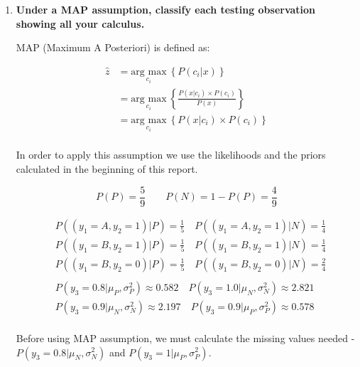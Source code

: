 \documentclass[12pt]{article}
\begin{document}
\begin{enumerate}[leftmargin=\labelsep]
    \item \textbf{Under a MAP assumption, classify each testing observation showing all your
    calculus.}

    \vspace{10pt}
    MAP (Maximum A Posteriori) is defined as:
    
    \begin{equation}\label{map}
        \begin{aligned}
          \hat{z} & = \underset{c_i}{\text{arg max}} \medspace \left\{P(c_i | x)\right\} \\
                  & = \underset{c_i}{\text{arg max}} \medspace \left\{\frac{P(x | c_i)  \times P(c_i)}{P(x)}\right\} \\
                  & = \underset{c_i}{\text{arg max}} \medspace \left\{P(x | c_i)  \times P(c_i)\right\} \\
        \end{aligned}
    \end{equation}

    \vspace{10pt}
    In order to apply this assumption we use the likelihoods and the priors calculated in the beginning of this report.

    \begin{equation*}
        P(P) = \frac{5}{9} \quad \quad P(N) = 1- P(P) = \frac{4}{9} 
    \end{equation*}

    \begin{equation*}
        \begin{aligned}
        &P((y_1 = A, y_2 = 1)|P) = \frac{1}{5} \quad P((y_1 = A, y_2 = 1)|N) = \frac{1}{4}\\
        &P((y_1 = B, y_2 = 1)|P) = \frac{1}{5} \quad P((y_1 = B, y_2 = 1)|N) = \frac{1}{4}\\
        &P((y_1 = B, y_2 = 0)|P) = \frac{1}{5} \quad P((y_1 = B, y_2 = 0)|N) = \frac{2}{4}\\
        \\
        &P(y_3 = 0.8|\mu_P, \sigma_P^2) \approx 0.582 \quad P(y_3 = 1.0|\mu_N, \sigma_N^2) \approx 2.821\\
        &P(y_3 = 0.9|\mu_N, \sigma_N^2) \approx 2.197 \quad P(y_3 = 0.9|\mu_P, \sigma_P^2) \approx 0.578\\
        \end{aligned}
    \end{equation*}

    \vspace{10pt}
    Before using MAP assumption, we must calculate the missing values needed - $P(y_3 = 0.8|\mu_N, \sigma_N^2)$ and $P(y_3 = 1|\mu_P, \sigma_P^2)$.


\end{enumerate}
\end{document}
